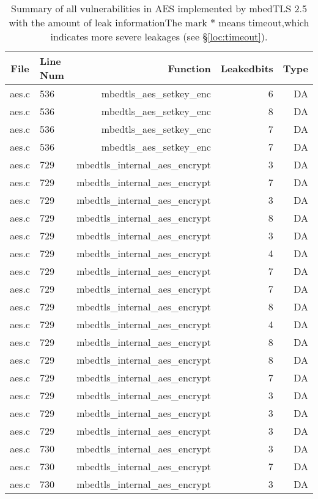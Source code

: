 \begin{table}%
\centering
\caption{Summary of all vulnerabilities in AES implemented by mbedTLS 2.5 with the amount of leak informationThe mark $*$ means timeout,which indicates more severe leakages (see \S\ref{loc:timeout}).}\label{tab:AESmbedTLS}
\begin{tabular}{clrrr}
\hline
\textbf{File} & \textbf{Line Num} & \textbf{Function} & \textbf{Leakedbits} & \textbf{Type} \\\hline
aes.c& 536&mbedtls\_aes\_setkey\_enc&6 &DA\\
aes.c& 536&mbedtls\_aes\_setkey\_enc&8 &DA\\
aes.c& 536&mbedtls\_aes\_setkey\_enc&7 &DA\\
aes.c& 536&mbedtls\_aes\_setkey\_enc&7 &DA\\
aes.c& 729&mbedtls\_internal\_aes\_encrypt&3 &DA\\
aes.c& 729&mbedtls\_internal\_aes\_encrypt&7 &DA\\
aes.c& 729&mbedtls\_internal\_aes\_encrypt&3 &DA\\
aes.c& 729&mbedtls\_internal\_aes\_encrypt&8 &DA\\
aes.c& 729&mbedtls\_internal\_aes\_encrypt&3 &DA\\
aes.c& 729&mbedtls\_internal\_aes\_encrypt&4 &DA\\
aes.c& 729&mbedtls\_internal\_aes\_encrypt&7 &DA\\
aes.c& 729&mbedtls\_internal\_aes\_encrypt&7 &DA\\
aes.c& 729&mbedtls\_internal\_aes\_encrypt&8 &DA\\
aes.c& 729&mbedtls\_internal\_aes\_encrypt&4 &DA\\
aes.c& 729&mbedtls\_internal\_aes\_encrypt&8 &DA\\
aes.c& 729&mbedtls\_internal\_aes\_encrypt&8 &DA\\
aes.c& 729&mbedtls\_internal\_aes\_encrypt&7 &DA\\
aes.c& 729&mbedtls\_internal\_aes\_encrypt&3 &DA\\
aes.c& 729&mbedtls\_internal\_aes\_encrypt&3 &DA\\
aes.c& 729&mbedtls\_internal\_aes\_encrypt&3 &DA\\
aes.c& 730&mbedtls\_internal\_aes\_encrypt&3 &DA\\
aes.c& 730&mbedtls\_internal\_aes\_encrypt&7 &DA\\
aes.c& 730&mbedtls\_internal\_aes\_encrypt&3 &DA\\

\end{tabular}
\end{table}
